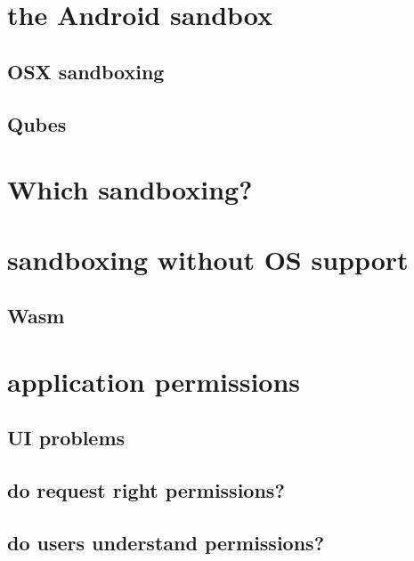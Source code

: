 \section{the Android sandbox}



\subsection{OSX sandboxing}


\subsection{Qubes}



\section{Which sandboxing?}


\section{sandboxing without OS support}


\subsection{Wasm}


\section{application permissions}


\subsection{UI problems}


\subsection{do request right permissions?}


\subsection{do users understand permissions?}


